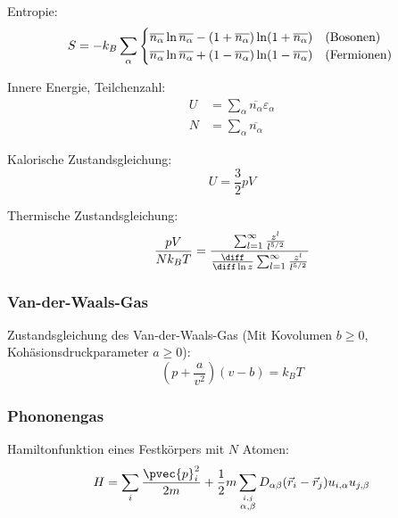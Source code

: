 \documentclass[11pt]{article}
\numberwithin{equation}{section}
\begin{document}
        Entropie:
        \begin{equation}
          S= -k_B\sum_\alpha
            \begin{cases}
              \overline{n_\alpha} \ln \overline{n_\alpha} - (1+\overline{n_\alpha}) \ln (1+\overline{n_\alpha}) & \text{(Bosonen)} \\
              \overline{n_\alpha} \ln \overline{n_\alpha} + (1-\overline{n_\alpha}) \ln (1-\overline{n_\alpha}) & \text{(Fermionen)}
            \end{cases} \\
        \end{equation}

        Innere Energie, Teilchenzahl:
        \begin{equation}
          \begin{aligned}
            U &= \sum_\alpha \overline{n_\alpha} \varepsilon_\alpha \\
            N &= \sum_\alpha \overline{n_\alpha}
          \end{aligned}
        \end{equation}

        Kalorische Zustandsgleichung:
        \begin{equation}
          U=\frac{3}{2}pV
        \end{equation}

        Thermische Zustandsgleichung:
        \begin{equation}
          \frac{pV}{N k_B T} = \frac{\sum_{l=1}^{\infty}\frac{z^l}{l^{5/2}}}{\tder{}{\ln z}\sum_{l=1}^{\infty}\frac{z^l}{l^{5/2}}}
        \end{equation}

      \subsubsection{Van-der-Waals-Gas}
        Zustandsgleichung des Van-der-Waals-Gas (Mit Kovolumen $b \ge 0$, Kohäsionsdruckparameter $a \ge 0$):
        \begin{equation}
          \left( p+\frac{a}{v^2} \right) \left( v-b \right) = k_B T
        \end{equation}

      \subsubsection{Phononengas}
        Hamiltonfunktion eines Festkörpers mit $N$ Atomen:
        \begin{equation}
          H=\sum_i \frac{\pvec{p}_i^2}{2m} + \frac{1}{2}m\sum_{\stackrel{i,j}{\alpha,\beta}} D_{\alpha\beta}(\vec{r}_i - \vec{r}_j)u_{i,\alpha}u_{j,\beta}
        \end{equation}
\end{document}
